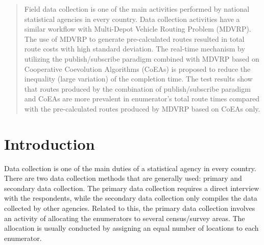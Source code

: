 \documentclass[conference]{IEEEtran}
\begin{document}




\maketitle

\begin{abstract}
Field data collection is one of the main activities performed by national statistical agencies in every country. Data collection activities have a similar workflow with Multi-Depot Vehicle Routing Problem (MDVRP). The use of MDVRP to generate pre-calculated routes resulted in total route costs with high standard deviation. The real-time mechanism by utilizing the publish/subscribe paradigm combined with MDVRP based on Cooperative Coevolution Algorithms (CoEAs) is proposed to reduce the inequality (large variation) of the completion time. The test results show that routes produced by the combination of publish/subscribe paradigm and CoEAs are more prevalent in enumerator's total route times compared with the pre-calculated routes produced by MDVRP based on CoEAs only.
\end{abstract}





%
\IEEEpeerreviewmaketitle




\section{Introduction}
\label{sec:introduction}
Data collection is one of the main duties of a statistical agency in every country. There are two data collection methods that are generally used: primary and secondary data collection. The primary data collection requires a direct interview with the respondents, while the secondary data collection only compiles the data collected by other agencies. Related to this, the primary data collection involves an activity of allocating the enumerators to several census/survey areas. The allocation is usually conducted by assigning an equal number of locations to each enumerator.
\end{document}
